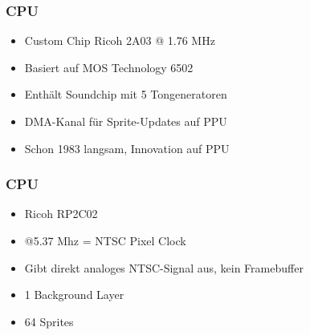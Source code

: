 \documentclass{beamer}
\begin{document}
    \begin{frame}
        \frametitle{CPU}
        \begin{itemize}
            \item{Custom Chip Ricoh 2A03 @ 1.76 MHz}
            \item{Basiert auf MOS Technology 6502}
            \item{Enthält Soundchip mit 5 Tongeneratoren}
            \item{DMA-Kanal für Sprite-Updates auf PPU}
            \item{Schon 1983 langsam, Innovation auf PPU}
        \end{itemize}
    \end{frame}
    
    \begin{frame}
        \frametitle{CPU}
        \begin{itemize}
            \item{Ricoh RP2C02}
            \item{@5.37 Mhz = NTSC Pixel Clock}
            \item{Gibt direkt analoges NTSC-Signal aus, kein Framebuffer}
            \item{1 Background Layer}
            \item{64 Sprites}
        \end{itemize}
    \end{frame}
        
\end{document}
